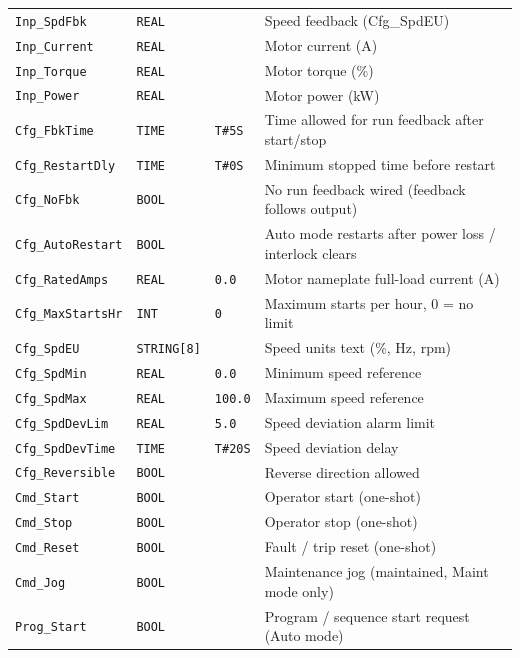 {\begin{longtable}{@{}>{\raggedright\arraybackslash}p{3.4cm}>{\raggedright\arraybackslash}p{3.3cm}>{\raggedright\arraybackslash}p{1.3cm}>{\raggedright\arraybackslash}p{6.4cm}@{}}
\texttt{Inp\_SpdFbk} & \texttt{REAL} &  & Speed feedback (Cfg\_SpdEU) \\
\texttt{Inp\_Current} & \texttt{REAL} &  & Motor current (A) \\
\texttt{Inp\_Torque} & \texttt{REAL} &  & Motor torque (\%) \\
\texttt{Inp\_Power} & \texttt{REAL} &  & Motor power (kW) \\
\texttt{Cfg\_FbkTime} & \texttt{TIME} & \texttt{T\#5S} & Time allowed for run feedback after start/\allowbreak{}stop \\
\texttt{Cfg\_RestartDly} & \texttt{TIME} & \texttt{T\#0S} & Minimum stopped time before restart \\
\texttt{Cfg\_NoFbk} & \texttt{BOOL} &  & No run feedback wired (feedback follows output) \\
\texttt{Cfg\_AutoRestart} & \texttt{BOOL} &  & Auto mode restarts after power loss /\allowbreak{} interlock clears \\
\texttt{Cfg\_RatedAmps} & \texttt{REAL} & \texttt{0.0} & Motor nameplate full-load current (A) \\
\texttt{Cfg\_MaxStartsHr} & \texttt{INT} & \texttt{0} & Maximum starts per hour, 0 = no limit \\
\texttt{Cfg\_SpdEU} & \texttt{STRING[8]} &  & Speed units text (\%, Hz, rpm) \\
\texttt{Cfg\_SpdMin} & \texttt{REAL} & \texttt{0.0} & Minimum speed reference \\
\texttt{Cfg\_SpdMax} & \texttt{REAL} & \texttt{100.0} & Maximum speed reference \\
\texttt{Cfg\_SpdDevLim} & \texttt{REAL} & \texttt{5.0} & Speed deviation alarm limit \\
\texttt{Cfg\_SpdDevTime} & \texttt{TIME} & \texttt{T\#20S} & Speed deviation delay \\
\texttt{Cfg\_Reversible} & \texttt{BOOL} &  & Reverse direction allowed \\
\texttt{Cmd\_Start} & \texttt{BOOL} &  & Operator start (one-shot) \\
\texttt{Cmd\_Stop} & \texttt{BOOL} &  & Operator stop (one-shot) \\
\texttt{Cmd\_Reset} & \texttt{BOOL} &  & Fault /\allowbreak{} trip reset (one-shot) \\
\texttt{Cmd\_Jog} & \texttt{BOOL} &  & Maintenance jog (maintained, Maint mode only) \\
\texttt{Prog\_Start} & \texttt{BOOL} &  & Program /\allowbreak{} sequence start request (Auto mode) \\

\end{longtable}}

